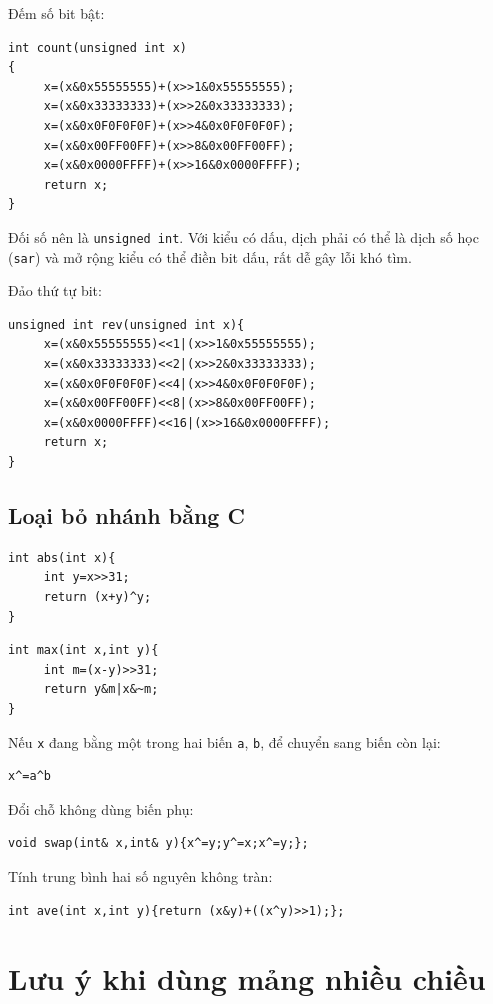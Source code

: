\documentclass[11pt]{article}
\begin{document}
Đếm số bit bật:
\begin{verbatim}
int count(unsigned int x)
{
     x=(x&0x55555555)+(x>>1&0x55555555);
     x=(x&0x33333333)+(x>>2&0x33333333);
     x=(x&0x0F0F0F0F)+(x>>4&0x0F0F0F0F);
     x=(x&0x00FF00FF)+(x>>8&0x00FF00FF);
     x=(x&0x0000FFFF)+(x>>16&0x0000FFFF);
     return x;
}
\end{verbatim}
Đối số nên là \texttt{unsigned int}. Với kiểu có dấu, dịch phải có thể là
dịch số học (\texttt{sar}) và mở rộng kiểu có thể điền bit dấu, rất dễ gây
lỗi khó tìm.

Đảo thứ tự bit:
\begin{verbatim}
unsigned int rev(unsigned int x){
     x=(x&0x55555555)<<1|(x>>1&0x55555555);
     x=(x&0x33333333)<<2|(x>>2&0x33333333);
     x=(x&0x0F0F0F0F)<<4|(x>>4&0x0F0F0F0F);
     x=(x&0x00FF00FF)<<8|(x>>8&0x00FF00FF);
     x=(x&0x0000FFFF)<<16|(x>>16&0x0000FFFF);
     return x;
}
\end{verbatim}

\subsection{Loại bỏ nhánh bằng C}

\begin{verbatim}
int abs(int x){
     int y=x>>31;
     return (x+y)^y;
}
\end{verbatim}

\begin{verbatim}
int max(int x,int y){
     int m=(x-y)>>31;
     return y&m|x&~m;
}
\end{verbatim}

Nếu \texttt{x} đang bằng một trong hai biến \texttt{a}, \texttt{b}, để chuyển
sang biến còn lại:
\begin{verbatim}
x^=a^b
\end{verbatim}

Đổi chỗ không dùng biến phụ:
\begin{verbatim}
void swap(int& x,int& y){x^=y;y^=x;x^=y;};
\end{verbatim}

Tính trung bình hai số nguyên không tràn:
\begin{verbatim}
int ave(int x,int y){return (x&y)+((x^y)>>1);};
\end{verbatim}

\section{Lưu ý khi dùng mảng nhiều chiều}
\end{document}
